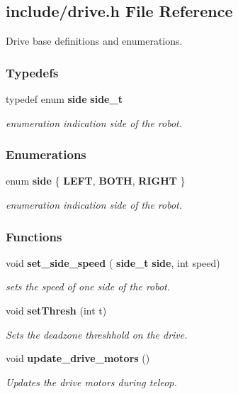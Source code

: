 \subsection{include/drive.h File Reference}
\label{drive_8h}


Drive base definitions and enumerations.  


\subsubsection*{Typedefs}
\begin{DoxyCompactItemize}
\item 
typedef enum \textbf{ side} \textbf{ side\+\_\+t}
\begin{DoxyCompactList}\small\item\em enumeration indication side of the robot. \end{DoxyCompactList}\end{DoxyCompactItemize}
\subsubsection*{Enumerations}
\begin{DoxyCompactItemize}
\item 
enum \textbf{ side} \{ \textbf{ L\+E\+FT}, 
\textbf{ B\+O\+TH}, 
\textbf{ R\+I\+G\+HT}
 \}\begin{DoxyCompactList}\small\item\em enumeration indication side of the robot. \end{DoxyCompactList}
\end{DoxyCompactItemize}
\subsubsection*{Functions}
\begin{DoxyCompactItemize}
\item 
void \textbf{ set\+\_\+side\+\_\+speed} (\textbf{ side\+\_\+t} \textbf{ side}, int speed)
\begin{DoxyCompactList}\small\item\em sets the speed of one side of the robot. \end{DoxyCompactList}\item 
void \textbf{ set\+Thresh} (int t)
\begin{DoxyCompactList}\small\item\em Sets the deadzone threshhold on the drive. \end{DoxyCompactList}\item 
void \textbf{ update\+\_\+drive\+\_\+motors} ()
\begin{DoxyCompactList}\small\item\em Updates the drive motors during teleop. \end{DoxyCompactList}\end{DoxyCompactItemize}


